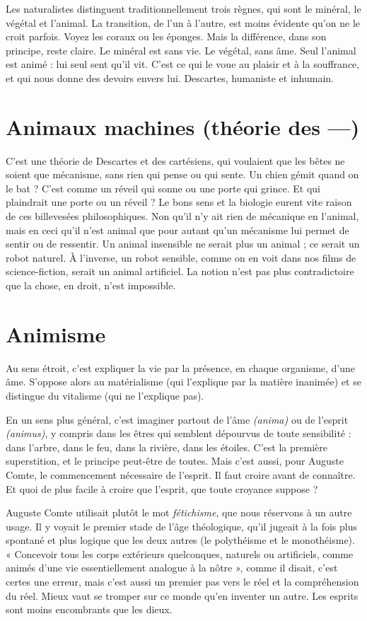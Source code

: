 Les naturalistes distinguent traditionnellement trois règnes, qui sont le
minéral, le végétal et l'animal. La transition, de l’un à l’autre, est moins évidente
qu’on ne le croit parfois. Voyez les coraux ou les éponges. Mais la différence,
dans son principe, reste claire. Le minéral est sans vie. Le végétal, sans
âme. Seul l'animal est animé : lui seul sent qu’il vit. C’est ce qui le voue au
plaisir et à la souffrance, et qui nous donne des devoirs envers lui. Descartes,
humaniste et inhumain.

\section{Animaux machines (théorie des —)}
C'est une théorie de Descartes
et des cartésiens, qui voulaient
que les bêtes ne soient que mécanisme, sans rien qui pense ou qui sente. Un
chien gémit quand on le bat ? C’est comme un réveil qui sonne ou une porte
qui grince. Et qui plaindrait une porte ou un réveil ? Le bons sens et la biologie
eurent vite raison de ces billevesées philosophiques. Non qu’il n’y ait
rien de mécanique en l’animal, mais en ceci qu’il n’est animal que pour
autant qu'un mécanisme lui permet de sentir ou de ressentir. Un animal
insensible ne serait plus un animal ; ce serait un robot naturel. À l'inverse, un
robot sensible, comme on en voit dans nos films de science-fiction, serait un
animal artificiel. La notion n’est pas plus contradictoire que la chose, en
droit, n’est impossible.

\section{Animisme}
Au sens étroit, c’est expliquer la vie par la présence, en chaque
organisme, d’une âme. S’oppose alors au matérialisme (qui
l'explique par la matière inanimée) et se distingue du vitalisme (qui ne
l'explique pas).

En un sens plus général, c’est imaginer partout de l’âme {\it (anima)} ou de
l'esprit {\it (animus)}, y compris dans les êtres qui semblent dépourvus de toute
sensibilité : dans l'arbre, dans le feu, dans la rivière, dans les étoiles. C’est la
première superstition, et le principe peut-être de toutes. Mais c’est aussi, pour
Auguste Comte, le commencement nécessaire de l'esprit. Il faut croire avant de
connaître. Et quoi de plus facile à croire que l'esprit, que toute croyance
suppose ?

Auguste Comte utilisait plutôt le mot {\it fétichisme}, que nous réservons à
un autre usage. Il y voyait le premier stade de l’âge théologique, qu’il jugeait
à la fois plus spontané et plus logique que les deux autres (le polythéisme et
le monothéisme). « Concevoir tous les corps extérieurs quelconques, naturels
ou artificiels, comme animés d’une vie essentiellement analogue à la
nôtre », comme il disait, c’est certes une erreur, mais c’est aussi un premier
pas vers le réel et la compréhension du réel. Mieux vaut se tromper sur ce
monde qu’en inventer un autre. Les esprits sont moins encombrants que les
dieux.

